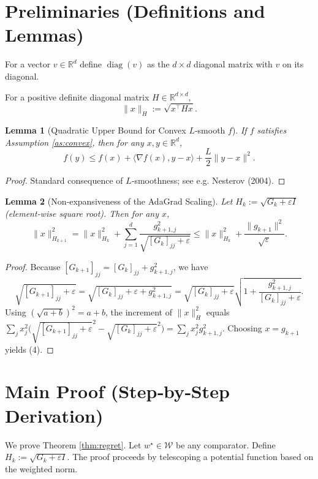 \documentclass{article}
\newtheorem{lemma}{Lemma}
\newcommand{\R}{\mathbb{R}}
\begin{document}
\newpage
\section*{Preliminaries (Definitions and Lemmas)}
\begin{definition}
For a vector $v\in\R^{d}$ define $\operatorname{diag}(v)$ as the $d\times d$ diagonal
matrix with $v$ on its diagonal.
\end{definition}
\begin{definition}
For a positive definite diagonal matrix $H\in\R^{d\times d}$,
\[
\|x\|_{H} := \sqrt{x^{\!\top} H x}.
\]
\end{definition}
\begin{lemma}[Quadratic Upper Bound for Convex $L$‑smooth $f$]\label{lem:smooth}
If $f$ satisfies Assumption \ref{as:convex}, then for any $x,y\in\R^{d}$,
\[
f(y)\le f(x)+\langle\nabla f(x),y-x\rangle+\frac{L}{2}\|y-x\|^2 .
\tag{3}
\]
\end{lemma}
\begin{proof}
Standard consequence of $L$‑smoothness; see e.g. Nesterov (2004). \qedhere
\end{proof}
\begin{lemma}[Non‑expansiveness of the AdaGrad Scaling]\label{lem:scaling}
Let $H_k:=\sqrt{G_k+\varepsilon I}$ (element‑wise square root). Then for any $x$,
\[
\|x\|_{H_{k+1}}^2 = \|x\|_{H_k}^2 + \sum_{j=1}^{d}\frac{g_{k+1,j}^2}{\sqrt{[G_k]_{jj}+\varepsilon}}
\le \|x\|_{H_k}^2 + \frac{\|g_{k+1}\|^2}{\sqrt{\varepsilon}} .
\tag{4}
\]
\end{lemma}
\begin{proof}
Because $[G_{k+1}]_{jj}=[G_k]_{jj}+g_{k+1,j}^2$, we have
\[
\sqrt{[G_{k+1}]_{jj}+\varepsilon}
= \sqrt{[G_k]_{jj}+\varepsilon+g_{k+1,j}^2}
= \sqrt{[G_k]_{jj}+\varepsilon}
\sqrt{1+\frac{g_{k+1,j}^2}{[G_k]_{jj}+\varepsilon}} .
\]
Using $(\sqrt{a+b})^2=a+b$, the increment of $\|x\|_{H}^2$ equals
$\sum_j x_j^2\big(\sqrt{[G_{k+1}]_{jj}+\varepsilon}^2-
\sqrt{[G_k]_{jj}+\varepsilon}^2\big)=\sum_j x_j^2 g_{k+1,j}^2$.
Choosing $x= g_{k+1}$ yields (4). \qedhere
\end{proof}

\newpage
\section*{Main Proof (Step‑by‑Step Derivation)}
We prove Theorem \ref{thm:regret}.  
Let $w^\star\in\mathcal{W}$ be any comparator. Define $H_k:=\sqrt{G_k+\varepsilon I}$.
The proof proceeds by telescoping a potential function based on the weighted norm.
\end{document}
